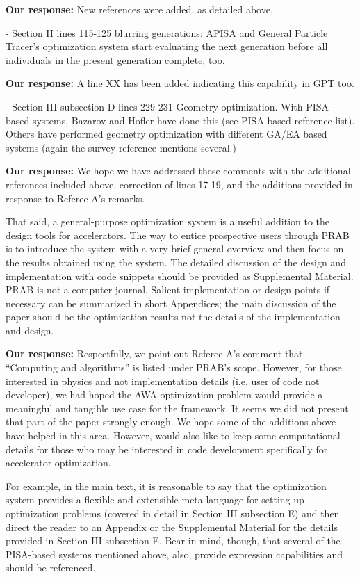 \documentclass{article}
\begin{document}
{\bf Our response:} {\color{blue} New references were added, as detailed above.}

- Section II lines 115-125 blurring generations: APISA and General
Particle Tracer’s optimization system start evaluating the next
generation before all individuals in the present generation complete,
too.

{\bf Our response:} {\color{blue} A line XX has been added indicating this capability in GPT too.}

- Section III subsection D lines 229-231 Geometry optimization. With
PISA-based systems, Bazarov and Hofler have done this (see PISA-based
reference list). Others have performed geometry optimization with
different GA/EA based systems (again the survey reference mentions
several.)

{\bf Our response:} {\color{blue} We hope we have addressed these comments with the additional references included above, correction of lines 17-19, 
	and the additions provided in response to Referee A's remarks.}

That said, a general-purpose optimization system is a useful addition
to the design tools for accelerators. The way to entice prospective
users through PRAB is to introduce the system with a very brief
general overview and then focus on the results obtained using the
system. The detailed discussion of the design and implementation with
code snippets should be provided as Supplemental Material. PRAB is not
a computer journal. Salient implementation or design points if
necessary can be summarized in short Appendices; the main discussion
of the paper should be the optimization results not the details of the
implementation and design. 

{\bf Our response:} {\color{blue} 
	Respectfully, we point out Referee A's comment that 
	``Computing and algorithms'' is listed under PRAB's scope. 
	However, for those interested in physics and not implementation details (i.e. user of code not developer), 
	we had hoped the AWA optimization problem would 
	provide a meaningful and tangible use case for the framework.
	It seems we did not present that part of the paper strongly enough. 
	We hope some of the additions above have helped in this area.
	However, would also like to keep some computational details for those who 
	may be interested in code development specifically for accelerator optimization.
}


For example, in the main text, it is
reasonable to say that the optimization system provides a flexible and
extensible meta-language for setting up optimization problems (covered
in detail in Section III subsection E) and then direct the reader to
an Appendix or the Supplemental Material for the details provided in
Section III subsection E. Bear in mind, though, that several of the
PISA-based systems mentioned above, also, provide expression
capabilities and should be referenced. 
\end{document}

